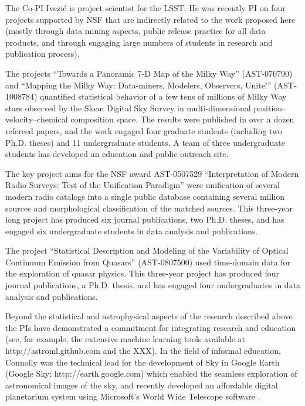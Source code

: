 The Co-PI Ivezi\'{c} is project scientist for the LSST. He was
recently PI on four projects supported by NSF that are indirectly
related to the work proposed here (mostly through data mining aspects,
public release practice for all data products, and through engaging
large numbers of students in research and publication process).

The projects ``Towards a Panoramic 7-D Map of the Milky Way''
(AST-070790) and ``Mapping the Milky Way: Data-miners, Modelers,
Observers, Unite!'' (AST-1008784) quantified statistical behavior of a
few tens of millions of Milky Way stars observed by the Sloan Digital
Sky Survey in multi-dimensional position--velocity--chemical
composition space. The results were published in over a dozen refereed
papers, and the work engaged four graduate students (including two
Ph.D. theses) and 11 undergraduate students.  A team of three
undergraduate students has developed an education and public outreach
site.

The key project aims for the NSF award AST-0507529 ``Interpretation of
Modern Radio Surveys: Test of the Unification Paradigm'' were
unification of several modern radio catalogs into a single public
database containing several million sources and morphological
classification of the matched sources. This three-year long project
has produced six journal publications, two Ph.D. theses, and has
engaged six undergraduate students in data analysis and publications.

The project ``Statistical Description and Modeling of the Variability
of Optical Continuum Emission from Quasars'' (AST-0807500) used
time-domain data for the exploration of quasar physics. This
three-year project has produced four journal publications, a
Ph.D. thesis, and has engaged four undergraduates in data analysis and
publications.



Beyond the statistical and astrophysical aspects of the research
described above the PIs have demonstrated a commitment for integrating
research and education (see, for example, the extensive machine
learning tools available at http://astroml.github.com and the XXX). In
the field of informal education, Connolly was the technical lead for
the development of Sky in Google Earth (Google Sky;
http://earth.google.com) which enabled the seamless exploration of
astronomical images of the sky, and recently developed an affordable
digital planetarium system using Microsoft's World Wide Telescope
software \cite{rosenfield2011}.

